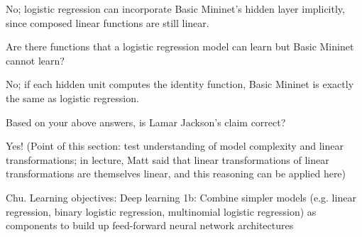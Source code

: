 \begin{parts}
\begin{subparts}
            \begin{tcolorbox}[fit,height=3cm, width=15cm, blank, borderline={1pt}{-2pt}]
            \end{tcolorbox}
            \begin{soln}
                No; logistic regression can incorporate Basic Mininet's hidden layer implicitly, since composed linear functions are still linear.
            \end{soln}


        \subpart[2]
            Are there functions that a logistic regression model can learn but Basic Mininet cannot learn?
            
            \begin{tcolorbox}[fit,height=3cm, width=15cm, blank, borderline={1pt}{-2pt}]
            \end{tcolorbox}
            \begin{soln}
                No; if each hidden unit computes the identity function, Basic Mininet is exactly the same as logistic regression.
            \end{soln}
            
            
        \subpart[2]
            Based on your above answers, is Lamar Jackson's claim correct?
            
            \begin{tcolorbox}[fit,height=3cm, width=15cm, blank, borderline={1pt}{-2pt}]
            \end{tcolorbox}
            \begin{soln}
                Yes! (Point of this section: test understanding of model complexity and linear transformations; in lecture, Matt said that linear transformations of linear transformations are themselves linear, and this reasoning can be applied here)
            \end{soln}
    \end{subparts}
    
    
    \begin{qauthor}
       Chu. Learning objectives: Deep learning 1b: Combine simpler models (e.g. linear regression, binary logistic regression, multinomial logistic regression) as components to build up feed-forward neural network architectures
    \end{qauthor}



\end{parts}
